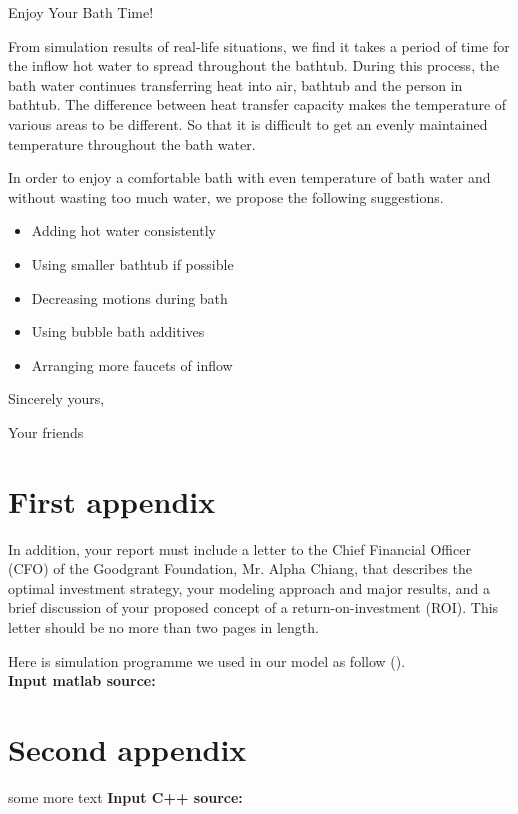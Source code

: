 \documentclass{mcmthesis}
\begin{document}
\printbibliography

\newpage

\begin{letter}{Enjoy Your Bath Time!}

From simulation results of real-life situations, we find it takes a period of 
time for the inflow hot water to spread throughout the bathtub. During this 
process, the bath water continues transferring heat into air, bathtub and the 
person in bathtub. The difference between heat transfer capacity makes the 
temperature of various areas to be different. So that it is difficult to get 
an evenly maintained temperature throughout the bath water.

In order to enjoy a comfortable bath with even temperature of bath water and 
without wasting too much water, we propose the following suggestions.

\begin{itemize}
\item Adding hot water consistently
\item Using smaller bathtub if possible
\item Decreasing motions during bath
\item Using bubble bath additives
\item Arranging more faucets of inflow
\end{itemize}

\vspace{\parskip}

Sincerely yours,

Your friends

\end{letter}

\newpage

\begin{appendices}

\section{First appendix}

In addition, your report must include a letter to the Chief Financial Officer 
(CFO) of the Goodgrant Foundation, Mr. Alpha Chiang, that describes the optimal 
investment strategy, your modeling approach and major results, and a brief 
discussion of your proposed concept of a return-on-investment (ROI). This letter 
should be no more than two pages in length.

Here is simulation programme we used in our model as follow (\cite{Liu02}).\\

\textbf{\textcolor[rgb]{0.98,0.00,0.00}{Input matlab source:}}


\section{Second appendix}

some more text \textcolor[rgb]{0.98,0.00,0.00}{\textbf{Input C++ source:}}


\end{appendices}
\end{document}
